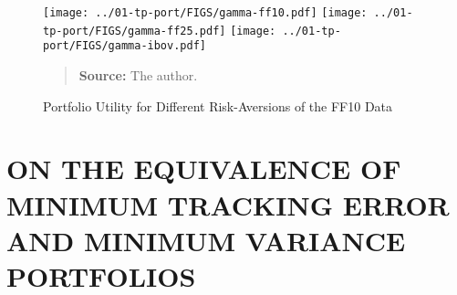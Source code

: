 \documentclass[12pt,oneside,a4paper]{memoir}
\begin{document}
\clearpage

%    


\begin{figure}[ht!]
\centering
\scriptsize
\caption{Portfolio Utility for Different Risk-Aversions of the FF10 Data}
\label{fig:gamas} %
\vspace{-1 em}

\vspace{-1 em}
\texttt{[image: ../01-tp-port/FIGS/gamma-ff10.pdf]}
\vspace{-1 em}
\texttt{[image: ../01-tp-port/FIGS/gamma-ff25.pdf]}
\vspace{-1 em}
\texttt{[image: ../01-tp-port/FIGS/gamma-ibov.pdf]}
\vspace{-1 em}
\begin{quote}
\textbf{Source:} The author.
\end{quote}
\end{figure}


\chapter{ON THE EQUIVALENCE OF MINIMUM TRACKING ERROR AND MINIMUM VARIANCE PORTFOLIOS}
\end{document}
